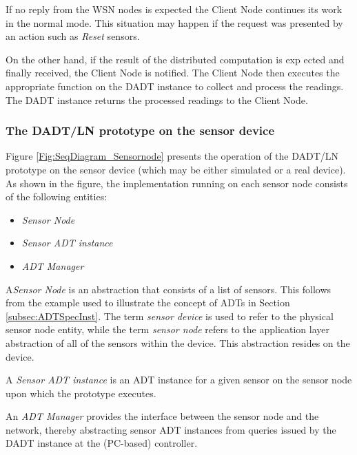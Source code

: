 If no reply from the WSN nodes is expected the Client Node continues its work in
the normal mode. This situation may happen if the request was presented by an
action such as \emph{Reset} sensors. 
 
On the other hand, if the result of the distributed computation is exp ected and
finally received, the Client Node is notified. The Client Node then executes the
appropriate function on the DADT instance to collect and process the readings.
The DADT instance returns the processed readings to the Client Node.

\subsubsection{The DADT/LN prototype on the sensor device} \label{subsubsec:DADTLNSensorDevice}

Figure \ref{Fig:SeqDiagram_Sensornode} presents the operation of the DADT/LN
prototype on the sensor device (which may be either simulated or a real
device). As shown in the figure, the implementation running on each sensor node 
consists of the following entities:

\begin{itemize}
  \item \emph{Sensor Node} 
  \item \emph{Sensor ADT instance} 
  \item \emph{ADT Manager} 
\end{itemize}

A\emph{Sensor Node} is an abstraction that consists of a list of sensors. This
follows from the example used to illustrate the concept of ADTs in Section
\ref{subsec:ADTSpecInst}. The term \emph{sensor device} is used to refer to the
physical sensor node entity, while the term \emph{sensor node} refers to the application
layer abstraction of all of the sensors within the device. This abstraction
resides on the device.

A \emph{Sensor ADT instance} is an ADT instance for a given sensor on the sensor
node upon which the prototype executes.

An \emph{ADT Manager} provides the interface between the sensor node and the
network, thereby abstracting sensor ADT instances from queries issued by the DADT
instance at the (PC-based) controller.

